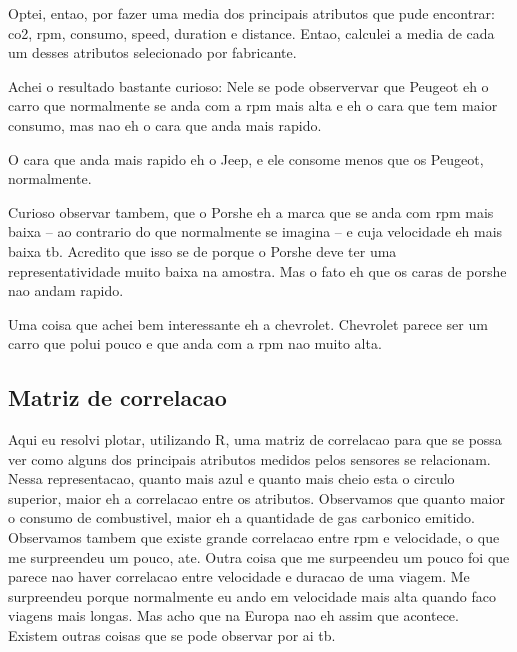 \documentclass[10pt, conference]{IEEEtran}
\begin{document}
Optei, entao, por fazer uma media dos principais atributos que pude encontrar: co2, rpm, consumo, speed, duration 
e distance. Entao, calculei a media de cada um desses atributos selecionado por fabricante.

Achei o resultado bastante curioso: Nele se pode observervar que Peugeot eh o carro que normalmente se anda com
a rpm mais alta e eh o cara que tem maior consumo, mas nao eh o cara que anda mais rapido. 

O cara que anda mais rapido eh o Jeep, e ele consome menos que os Peugeot, normalmente.

Curioso observar tambem, que o Porshe eh a marca que se anda com rpm mais baixa -- ao contrario do que normalmente
se imagina -- e cuja velocidade eh mais baixa tb. Acredito que isso se de porque o Porshe deve ter uma
representatividade muito baixa na amostra. Mas o fato eh que os caras de porshe nao andam rapido.

Uma coisa que achei bem interessante eh a chevrolet. Chevrolet parece ser um carro que polui pouco e que
anda com a rpm nao muito alta.







\subsection{Matriz de correlacao}

Aqui eu resolvi plotar, utilizando R, uma matriz de correlacao para que se possa ver
como alguns dos principais atributos medidos pelos sensores se relacionam. Nessa
representacao, quanto mais azul e quanto mais cheio esta o circulo superior, maior
eh a correlacao entre os atributos. Observamos que quanto maior o consumo de combustivel,
maior eh a quantidade de gas carbonico emitido. Observamos tambem que existe grande
correlacao entre rpm e velocidade, o que me surpreendeu um pouco, ate. Outra coisa
que me surpeendeu um pouco foi que parece nao haver correlacao entre velocidade e duracao
de uma viagem. Me surpreendeu porque normalmente eu ando em velocidade mais alta quando
faco viagens mais longas. Mas acho que na Europa nao eh assim que acontece. Existem
outras coisas que se pode observar por ai tb.

\end{document}
